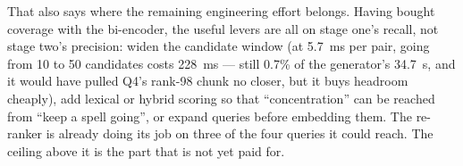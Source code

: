 \documentclass[11pt,a4paper]{article}
\begin{document}
That also says where the remaining engineering effort belongs. Having bought
coverage with the bi-encoder, the useful levers are all on stage one's recall,
not stage two's precision: widen the candidate window (at 5.7~ms per pair, going
from 10 to 50 candidates costs 228~ms --- still 0.7\% of the generator's
34.7~s, and it would have pulled Q4's rank-98 chunk no closer, but it buys
headroom cheaply), add lexical or hybrid scoring so that ``concentration''
can be reached from ``keep a spell going'', or expand queries before embedding
them. The re-ranker is already doing its job on three of the four queries it
could reach. The ceiling above it is the part that is not yet paid for.
\end{document}
